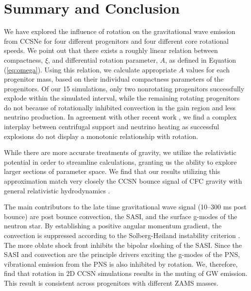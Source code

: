\documentclass[twocolumn,times]{aastex62}  %
\begin{document}



\section{Summary and Conclusion}
\label{sec:summary}

We have explored the influence of rotation on the gravitational wave emission from CCSNe for four different progenitors and four different core rotational speeds.  
We point out that there exists a roughly linear relation between compactness, $\xi$, and differential rotation parameter, $A$, as defined in Equation (\ref{eq:omega}). 
Using this relation, we calculate appropriate $A$ values for each progenitor mass, based on their individual compactness parameters of the \citet{Suk:2016} progenitors.  Of our 15 simulations, only two nonrotating progenitors successfully explode within the simulated interval, while the remaining rotating progenitors do not because of rotationally inhibited convection in the gain region and less neutrino production.  In agreement with other recent work \citep[e.g.,][]{summa:2018}, we find a complex interplay between centrifugal support and neutrino heating as successful explosions do not display a monotonic relationship with rotation.

While there are more accurate treatments of gravity, we utilize the relativistic potential in order to streamline calculations, granting us the ability to explore larger sections of parameter space. 
We find that our results utilizing this approximation match very closely the CCSN bounce signal of CFC gravity with general relativistic hydrodynamics \citep{richers:2017}.  

The main contributors to the late time gravitational wave signal (10--300 ms post bounce) are post bounce convection, the SASI, and the surface g-modes of the neutron star.  By establishing a positive angular momentum gradient, the convection is suppressed according to the Solberg-H{\o}iland instability criterion \citep{endal:1978,fryer:2000}.  The more oblate shock front inhibits the bipolar sloshing of the SASI.  Since the SASI and convection are the principle drivers exciting the g-modes of the PNS, vibrational emission from the PNS is also inhibited by rotation.  
We, therefore, find that rotation in 2D CCSN simulations results in the muting of GW emission.
This result is consistent across progenitors with different ZAMS masses. 
\end{document}
